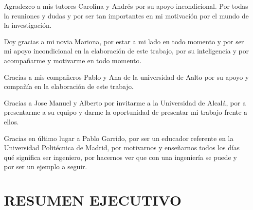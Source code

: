 \documentclass[a4paper, 11pt, spanish, twoside]{article}
\newcommand\blankpage{%
    \null
    \thispagestyle{empty}%
    \newpage}
\begin{document}
Agradezco a mis tutores Carolina y Andrés por su apoyo incondicional. Por todas la reuniones y dudas y por ser tan importantes en mi motivación por el mundo de la investigación.  

Doy gracias a mi novia Mariona, por estar a mi lado en todo momento y por ser mi apoyo incondicional en la elaboración de este trabajo, por su inteligencia y por acompañarme y motivarme en todo momento. 

Gracias a mis compañeros Pablo y Ana de la universidad de Aalto por su apoyo y compañía en la elaboración de este trabajo. 

Gracias a Jose Manuel y Alberto por invitarme a la Universidad de Alcalá, por a presentarme a su equipo y darme la oportunidad de presentar mi trabajo frente a ellos.

Gracias en último lugar a Pablo Garrido, por ser un educador referente en la Universidad Politécnica de Madrid, por motivarnos y enseñarnos todos los días qué significa ser ingeniero, por hacernos ver que con una ingeniería se puede y por ser un ejemplo a seguir.


\newpage



\section*{RESUMEN EJECUTIVO} %

\afterpage{\blankpage} %

\end{document}
